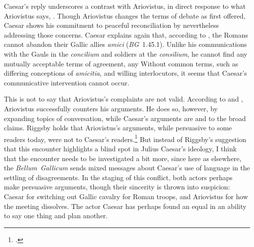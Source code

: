\documentclass[12pt,letterpaper,oneside,final]{memoir}
\begin{document}
Caesar's reply underscores a contrast with Ariovistus, in direct response to what Ariovistus says, . Though Ariovistus changes the terms of debate as first offered, Caesar shows his commitment to peaceful reconciliation by nevertheless addressing those concerns. Caesar explains again that, according to , the Romans cannot abandon their Gallic allies \emph{amici} (\emph{BG}~1.45.1). Unlike his communications with the Gauls in the \emph{concilium} and soldiers at the \emph{consilium}, he cannot find any mutually acceptable terms of agreement, any  Without common terms, such as differing conceptions of \emph{amicitia}, and willing interlocutors, it seems that Caesar's communicative intervention cannot occur.

This is not to say that Ariovistus's complaints are not valid. According to \textcite[246--247]{meier1995} and \textcite[184--187]{riggsby2006}, Ariovistus successfully counters his arguments. He does so, however, by expanding topics of conversation, while Caesar's arguments are  and  to the broad claims. Riggsby holds that Ariovistus's arguments, while persuasive to some readers today, were not to Caesar's readers.\footnote{.} But instead of Riggsby's suggestion that this encounter highlights a blind spot in Julius Caesar's ideology, I think that the encounter needs to be investigated a bit more, since here as elsewhere, the \emph{Bellum~Gallicum} sends mixed messages about Caesar's use of language in the settling of disagreements. In the staging of this conflict, both actors perhaps make persuasive arguments, though their sincerity is thrown into suspicion: Caesar for switching out Gallic cavalry for Roman troops, and Ariovistus for how the meeting dissolves. The actor Caesar has perhaps found an equal in an ability to say one thing and plan another.
\end{document}
